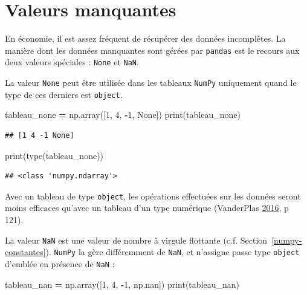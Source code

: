 \documentclass[12pt,]{book}
\newenvironment{Shaded}{\begin{snugshade}}{\end{snugshade}}
\newcommand{\DecValTok}[1]{\textcolor[rgb]{0.00,0.00,0.81}{#1}}
\newcommand{\VariableTok}[1]{\textcolor[rgb]{0.00,0.00,0.00}{#1}}
\newcommand{\OperatorTok}[1]{\textcolor[rgb]{0.81,0.36,0.00}{\textbf{#1}}}
\newcommand{\BuiltInTok}[1]{#1}
\newcommand{\NormalTok}[1]{#1}
\numberwithin{equation}{section}
\numberwithin{countremarque}{section}
\begin{document}
\section{Valeurs manquantes}\label{valeurs-manquantes}

En économie, il est assez fréquent de récupérer des données incomplètes.
La manière dont les données manquantes sont gérées par \texttt{pandas}
est le recours aux deux valeurs spéciales : \texttt{None} et
\texttt{NaN}.

La valeur \texttt{None} peut être utilisée dans les tableaux
\texttt{NumPy} uniquement quand le type de ces derniers est
\texttt{object}.

\begin{Shaded}
\begin{Highlighting}[]
\NormalTok{tableau_none }\OperatorTok{=}\NormalTok{ np.array([}\DecValTok{1}\NormalTok{, }\DecValTok{4}\NormalTok{, }\OperatorTok{-}\DecValTok{1}\NormalTok{, }\VariableTok{None}\NormalTok{])}
\BuiltInTok{print}\NormalTok{(tableau_none)}
\end{Highlighting}
\end{Shaded}

\begin{lstlisting}
## [1 4 -1 None]
\end{lstlisting}

\begin{Shaded}
\begin{Highlighting}[]
\BuiltInTok{print}\NormalTok{(}\BuiltInTok{type}\NormalTok{(tableau_none))}
\end{Highlighting}
\end{Shaded}

\begin{lstlisting}
## <class 'numpy.ndarray'>
\end{lstlisting}

Avec un tableau de type \texttt{object}, les opérations effectuées sur
les données seront moins efficaces qu'avec un tableau d'un type
numérique (VanderPlas
\protect\hyperlink{ref-vanderplas2016python}{2016}, p 121).

La valeur \texttt{NaN} est une valeur de nombre à virgule flottante
(c.f. Section~\ref{numpy-constantes}). \texttt{NumPy} la gère
différemment de \texttt{NaN}, et n'assigne passe type \texttt{object}
d'emblée en présence de \texttt{NaN} :

\begin{Shaded}
\begin{Highlighting}[]
\NormalTok{tableau_nan }\OperatorTok{=}\NormalTok{ np.array([}\DecValTok{1}\NormalTok{, }\DecValTok{4}\NormalTok{, }\OperatorTok{-}\DecValTok{1}\NormalTok{, np.nan])}
\BuiltInTok{print}\NormalTok{(tableau_nan)}
\end{Highlighting}
\end{Shaded}
\end{document}
